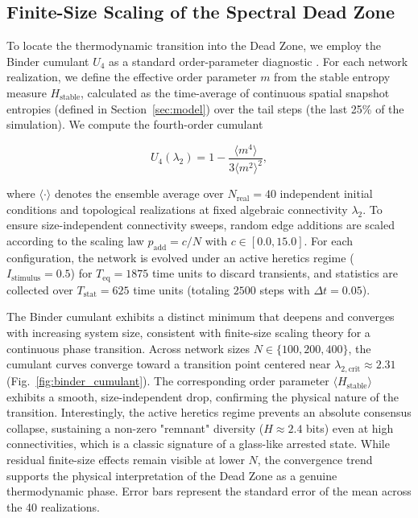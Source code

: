 \documentclass[11pt]{article}
\begin{document}
\subsection{Finite-Size Scaling of the Spectral Dead Zone}
\label{sec:binder_cumulant}

To locate the thermodynamic transition into the Dead Zone, we employ the Binder cumulant $U_4$ as a standard order-parameter diagnostic \cite{binder1981finite}. 
For each network realization, we define the effective order parameter $m$ from the stable entropy measure $H_{\text{stable}}$, calculated as the time-average of continuous spatial snapshot entropies (defined in Section~\ref{sec:model}) over the tail steps (the last 25\% of the simulation). We compute the fourth-order cumulant

\begin{equation}
U_4(\lambda_2) = 1 - \frac{\langle m^4 \rangle}{3\langle m^2 \rangle^2},
\end{equation}

where $\langle \cdot \rangle$ denotes the ensemble average over $N_{\text{real}} = 40$ independent initial conditions and topological realizations at fixed algebraic connectivity $\lambda_2$. To ensure size-independent connectivity sweeps, random edge additions are scaled according to the scaling law $p_{\text{add}} = c / N$ with $c \in [0.0, 15.0]$. For each configuration, the network is evolved under an active heretics regime ($I_{\text{stimulus}} = 0.5$) for $T_{\text{eq}} = 1875$ time units to discard transients, and statistics are collected over $T_{\text{stat}} = 625$ time units (totaling $2500$ steps with $\Delta t = 0.05$).

The Binder cumulant exhibits a distinct minimum that deepens and converges with increasing system size, consistent with finite-size scaling theory for a continuous phase transition. Across network sizes $N \in \{100, 200, 400\}$, the cumulant curves converge toward a transition point centered near $\lambda_{2,\text{crit}} \approx 2.31$ (Fig.~\ref{fig:binder_cumulant}). The corresponding order parameter $\langle H_{\text{stable}} \rangle$ exhibits a smooth, size-independent drop, confirming the physical nature of the transition. Interestingly, the active heretics regime prevents an absolute consensus collapse, sustaining a non-zero "remnant" diversity ($H \approx 2.4$ bits) even at high connectivities, which is a classic signature of a glass-like arrested state. While residual finite-size effects remain visible at lower $N$, the convergence trend supports the physical interpretation of the Dead Zone as a genuine thermodynamic phase. Error bars represent the standard error of the mean across the 40 realizations.
\end{document}
